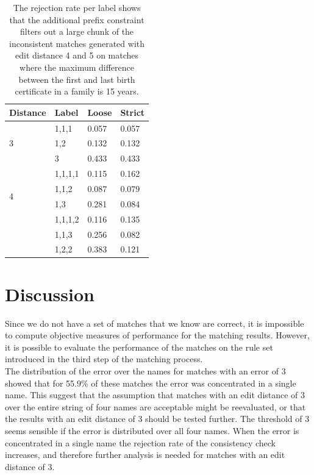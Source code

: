\begin{table}
	\begin{center}
		\caption[Rejection rate per label]{\label{tab:rejection_rate_label}The rejection rate per label shows that the additional prefix constraint filters out a large chunk of the inconsistent matches generated with edit distance 4 and 5 on matches where the maximum difference between the first and last birth certificate in a family is 15 years.}
		\vspace{0.5cm}
	\begin{tabular}{*{4}{l}}
		\toprule
		Distance & Label & Loose & Strict \\
		\toprule
		\multirow{3}{*}{3} & 1,1,1 & 0.057 & 0.057 \\
		& 1,2 & 0.132 & 0.132 \\
		& 3 & 0.433 & 0.433 \\
		\midrule
		\multirow{4}{*}{4} & 1,1,1,1 & 0.115 & 0.162 \\
		& 1,1,2 & 0.087 & 0.079 \\
		& 1,3 & 0.281 & 0.084 \\
		\midrule
		\multirow{4}{*}{5} & 1,1,1,2 & 0.116 & 0.135 \\
		& 1,1,3 & 0.256 & 0.082 \\
		& 1,2,2 & 0.383 & 0.121 \\
		\bottomrule
	\end{tabular}
	\end{center}
\end{table}

\section{Discussion}
Since we do not have a set of matches that we know are correct, it is impossible to compute objective measures of performance for the matching results. However, it is possible to evaluate the performance of the matches on the rule set introduced in the third step of the matching process.\\ 

The distribution of the error over the names for matches with an error of 3 showed that for 55.9\% of these matches the error was concentrated in a single name. This suggest that the assumption that matches with an edit distance of 3 over the entire string of four names are acceptable might be reevaluated, or that the results with an edit distance of 3 should be tested further. The threshold of 3 seems sensible if the error is distributed over all four names. When the error is concentrated in a single name the rejection rate of the consistency check increases, and therefore further analysis is needed for matches with an edit distance of 3.\\

